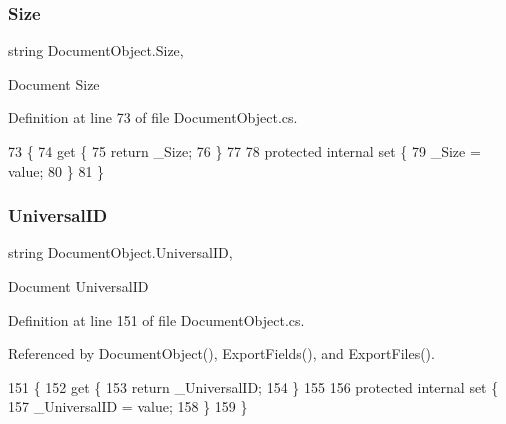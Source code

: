 \subsubsection{\texorpdfstring{Size}{Size}}
{\footnotesize\ttfamily string Document\+Object.\+Size\hspace{0.3cm}{\ttfamily [get]}, {\ttfamily [set]}}



Document Size 



Definition at line 73 of file Document\+Object.\+cs.


\begin{DoxyCode}
73                        \{
74         \textcolor{keyword}{get} \{
75             \textcolor{keywordflow}{return} \_Size;
76         \}
77 
78         \textcolor{keyword}{protected} \textcolor{keyword}{internal} \textcolor{keyword}{set} \{
79             \_Size = value;
80         \}
81     \}
\end{DoxyCode}
\mbox{\label{class_document_object_a8b96d04632a2802e7cc5466ca5cee8cf}} 
\subsubsection{\texorpdfstring{Universal\+ID}{UniversalID}}
{\footnotesize\ttfamily string Document\+Object.\+Universal\+ID\hspace{0.3cm}{\ttfamily [get]}, {\ttfamily [set]}}



Document Universal\+ID 



Definition at line 151 of file Document\+Object.\+cs.



Referenced by Document\+Object(), Export\+Fields(), and Export\+Files().


\begin{DoxyCode}
151                               \{
152         \textcolor{keyword}{get} \{
153             \textcolor{keywordflow}{return} \_UniversalID;
154         \}
155 
156         \textcolor{keyword}{protected} \textcolor{keyword}{internal} \textcolor{keyword}{set} \{
157             \_UniversalID = value;
158         \}
159     \}
\end{DoxyCode}
\mbox{\label{class_document_object_ac86b730cf8931b2221af577d32ca2f31}} 
